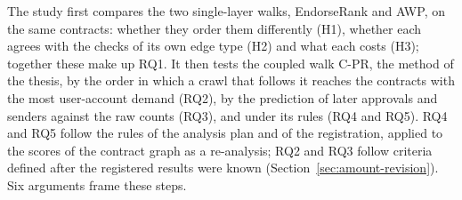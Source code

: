 The study first compares the two single-layer walks, EndorseRank and AWP, on the same contracts: whether they order them differently (H1), whether each agrees with the checks of its own edge type (H2) and what each costs (H3); together these make up RQ1. It then tests the coupled walk \mbox{C-PR}, the method of the thesis, by the order in which a crawl that follows it reaches the contracts with the most user-account demand (RQ2), by the prediction of later approvals and senders against the raw counts (RQ3), and under its rules (RQ4 and RQ5). RQ4 and RQ5 follow the rules of the analysis plan and of the registration, applied to the scores of the contract graph as a re-analysis; RQ2 and RQ3 follow criteria defined after the registered results were known (Section~\ref{sec:amount-revision}). Six arguments frame these steps.


